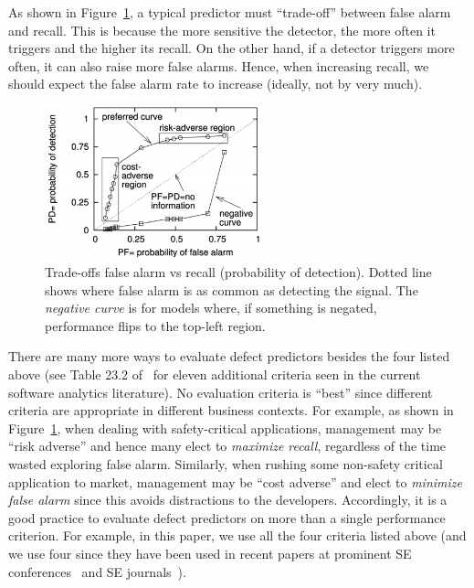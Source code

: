 \documentclass[sigconf,review, anonymous]{acmart}
\theoremstyle{break}
\theoremstyle{break}
\begin{document}
As shown in Figure~\ref{fig:trade},
a typical predictor must ``trade-off''
between false alarm and recall.
This is because the  more sensitive the detector, the more often it triggers and the higher its recall. On the other hand,  if a detector triggers more often, it can also raise more false alarms.
Hence, when increasing recall, we  should  expect
the false alarm rate to  increase
(ideally, not by very much).


\begin{figure}[!b]
\begin{center}
\includegraphics[width=2.5in]{roc.png}
\end{center}
\vspace{-0.2cm}
\caption{Trade-offs false alarm vs
recall (probability of detection). Dotted line shows where false alarm is as common as detecting the signal.
The {\em negative curve} is for models where, if something is negated, performance flips  to the top-left region. }\label{fig:trade}
\end{figure}

There are many more ways to evaluate defect predictors besides the four listed above
(see Table 23.2 of~\cite{menzies2014sharing} for   eleven additional
criteria seen in the current software analytics literature).
No evaluation criteria is ``best'' since different  criteria are appropriate in different business contexts. For example, as shown
in 
Figure~\ref{fig:trade},
when dealing
with safety-critical applications, management may be
``risk adverse'' and hence many elect
 to {\em maximize recall}, regardless of the time wasted exploring  false alarm.
 Similarly, 
when rushing some non-safety critical application to market, management may be ``cost adverse''
and elect to {\em minimize false alarm} since this avoids distractions to the developers. 
 Accordingly, it is a good practice to evaluate defect predictors on more than a single performance criterion. For example, in this paper,
we use all the four   criteria listed above
(and we use four since they have
been used in recent papers  
at prominent SE conferences~\cite{ghotra2015revisiting} and SE journals~\cite{fu2016tuning}).
 
\end{document}

